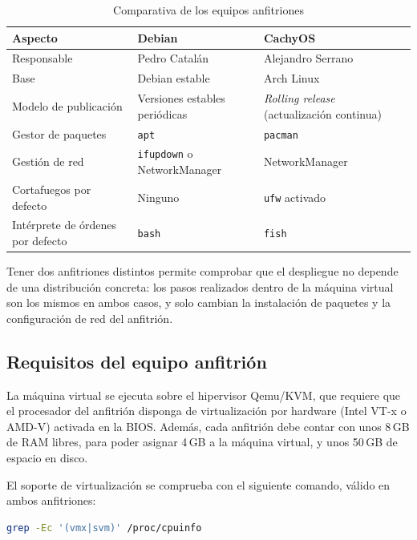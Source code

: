 \begin{table}[!htbp]
    \centering
    \begin{tabularx}{\textwidth}{L{4cm} Y Y}
        \toprule
        \textbf{Aspecto} & \textbf{Debian} & \textbf{CachyOS} \\
        \midrule
        Responsable & Pedro Catalán & Alejandro Serrano \\
        Base & Debian estable & Arch Linux \\
        Modelo de publicación & Versiones estables periódicas & \textit{Rolling release} (actualización continua) \\
        Gestor de paquetes & \texttt{apt} & \texttt{pacman} \\
        Gestión de red & \texttt{ifupdown} o NetworkManager & NetworkManager \\
        Cortafuegos por defecto & Ninguno & \texttt{ufw} activado \\
        Intérprete de órdenes por defecto & \texttt{bash} & \texttt{fish} \\
        \bottomrule
    \end{tabularx}
    \caption{Comparativa de los equipos anfitriones}
    \label{tab:anfitriones}
\end{table}

Tener dos anfitriones distintos permite comprobar que el despliegue no depende de una distribución concreta: los pasos realizados dentro de la máquina virtual son los mismos en ambos casos, y solo cambian la instalación de paquetes y la configuración de red del anfitrión.

\subsection{Requisitos del equipo anfitrión}

La máquina virtual se ejecuta sobre el hipervisor Qemu/KVM, que requiere que el procesador del anfitrión disponga de virtualización por hardware (Intel VT-x o AMD-V) activada en la BIOS. Además, cada anfitrión debe contar con unos 8\,GB de RAM libres, para poder asignar 4\,GB a la máquina virtual, y unos 50\,GB de espacio en disco.

El soporte de virtualización se comprueba con el siguiente comando, válido en ambos anfitriones:

\begin{lstlisting}[language=bash]
grep -Ec '(vmx|svm)' /proc/cpuinfo
\end{lstlisting}

